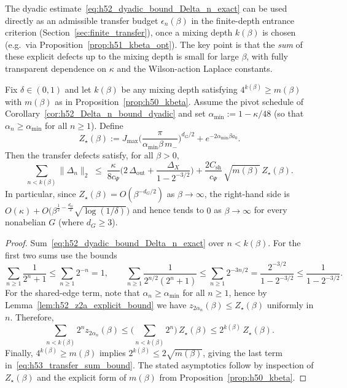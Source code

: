 The dyadic estimate~\eqref{eq:h52_dyadic_bound_Delta_n_exact} can be used directly as an admissible
transfer budget $\epsilon_n(\beta)$ in the finite-depth entrance criterion
(Section~\ref{sec:finite_transfer}), once a mixing depth $k(\beta)$ is chosen (e.g.\ via
Proposition~\ref{prop:h51_kbeta_opt}). The key point is that the \emph{sum} of these explicit defects up to the mixing
depth is small for large $\beta$, with fully transparent dependence on $\kappa$ and the
Wilson-action Laplace constants.

\begin{proposition}
\label{prop:h53_transfer_budget_summable}
Fix $\delta\in(0,1)$ and let $k(\beta)$ be any mixing depth satisfying
$4^{k(\beta)}\ge m(\beta)$ with $m(\beta)$ as in Proposition~\ref{prop:h50_kbeta}.
Assume the pivot schedule of Corollary~\ref{cor:h52_Delta_n_bound_dyadic} and set
$\alpha_{\min}:=1-\kappa/48$ (so that $\alpha_n\ge \alpha_{\min}$ for all $n\ge 1$).
Define
\[
Z_\star(\beta)
:=
J_{\max}\Big(\frac{\pi}{\alpha_{\min}\beta\,m_-}\Big)^{d_G/2}
+
e^{-2\alpha_{\min}\beta a_0}.
\]
Then the transfer defects satisfy, for all $\beta>0$,
\begin{equation}
\label{eq:h53_transfer_sum_bound}
\sum_{n<k(\beta)} \|\Delta_n\|_2
\;\le\;
\frac{\kappa}{8c_\Psi}\Bigg(
2\,\Delta_{\mathrm{out}}
+
\frac{\Delta_X}{1-2^{-3/2}}
\Bigg)
+
\frac{2C_{\mathrm{sh}}}{c_\Psi}\,\sqrt{m(\beta)}\,Z_\star(\beta).
\end{equation}
In particular, since $Z_\star(\beta)=O(\beta^{-d_G/2})$ as $\beta\to\infty$, the right-hand side
is $O(\kappa)+O\!\big(\beta^{\frac12-\frac{d_G}{2}}\sqrt{\log(1/\delta)}\big)$ and hence tends to $0$
as $\beta\to\infty$ for every nonabelian $G$ (where $d_G\ge 3$).
\end{proposition}

\begin{proof}
Sum~\eqref{eq:h52_dyadic_bound_Delta_n_exact} over $n<k(\beta)$.
For the first two sums use the bounds
\[
\sum_{n\ge 1}\frac{1}{2^n+1}\le \sum_{n\ge 1}2^{-n}=1,
\qquad
\sum_{n\ge 1}\frac{1}{2^{n/2}(2^n+1)}\le \sum_{n\ge 1}2^{-3n/2}
=\frac{2^{-3/2}}{1-2^{-3/2}}
\le \frac{1}{1-2^{-3/2}}.
\]
For the shared-edge term, note that $\alpha_n\ge\alpha_{\min}$ for all $n\ge 1$, hence by
Lemma~\ref{lem:h52_z2a_explicit_bound} we have $z_{2\alpha_n}(\beta)\le Z_\star(\beta)$ uniformly in $n$.
Therefore,
\[
\sum_{n<k(\beta)} 2^n z_{2\alpha_n}(\beta)
\le
\Big(\sum_{n<k(\beta)}2^n\Big)\,Z_\star(\beta)
\le
2^{k(\beta)}\,Z_\star(\beta).
\]
Finally, $4^{k(\beta)}\ge m(\beta)$ implies $2^{k(\beta)}\le 2\sqrt{m(\beta)}$, giving
the last term in~\eqref{eq:h53_transfer_sum_bound}. The stated asymptotics follow by inspection of
$Z_\star(\beta)$ and the explicit form of $m(\beta)$ from Proposition~\ref{prop:h50_kbeta}.
\end{proof}


